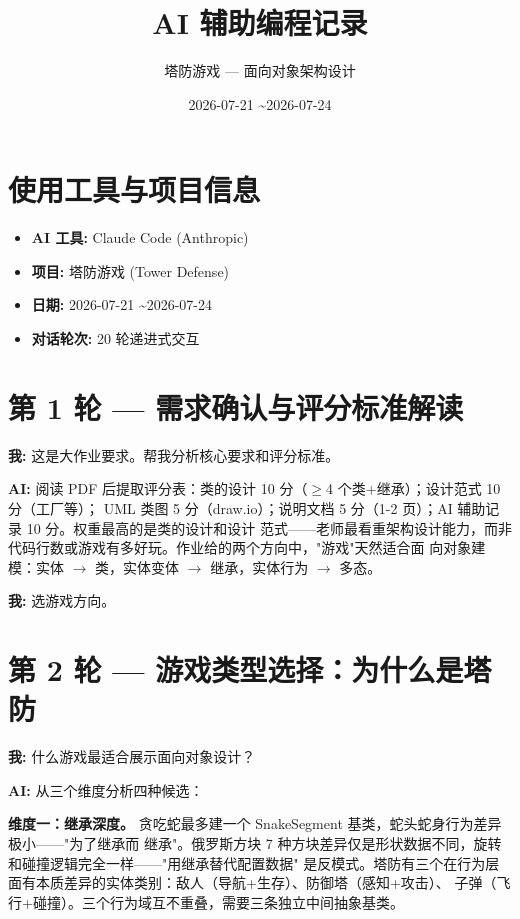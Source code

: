 \documentclass[12pt,a4paper]{ctexart}
\title{\textbf{AI 辅助编程记录}}
\author{塔防游戏 — 面向对象架构设计}
\date{2026-07-21 \textasciitilde 2026-07-24}
\begin{document}
\maketitle

\section*{使用工具与项目信息}

\begin{itemize}[noitemsep]
    \item \textbf{AI 工具:} Claude Code (Anthropic)
    \item \textbf{项目:} 塔防游戏 (Tower Defense)
    \item \textbf{日期:} 2026-07-21 \textasciitilde 2026-07-24
    \item \textbf{对话轮次:} 20 轮递进式交互
\end{itemize}

\section*{第 1 轮 — 需求确认与评分标准解读}

\textbf{我:} 这是大作业要求。帮我分析核心要求和评分标准。

\textbf{AI:} 阅读 PDF 后提取评分表：类的设计 10 分（$\geq$4 个类+继承）；设计范式 10 分（工厂等）；
UML 类图 5 分（draw.io）；说明文档 5 分（1-2 页）；AI 辅助记录 10 分。权重最高的是类的设计和设计
范式——老师最看重架构设计能力，而非代码行数或游戏有多好玩。作业给的两个方向中，"游戏"天然适合面
向对象建模：实体 $\rightarrow$ 类，实体变体 $\rightarrow$ 继承，实体行为 $\rightarrow$ 多态。

\textbf{我:} 选游戏方向。

\section*{第 2 轮 — 游戏类型选择：为什么是塔防}

\textbf{我:} 什么游戏最适合展示面向对象设计？

\textbf{AI:} 从三个维度分析四种候选：

\textbf{维度一：继承深度。} 贪吃蛇最多建一个 SnakeSegment 基类，蛇头蛇身行为差异极小——"为了继承而
继承"。俄罗斯方块 7 种方块差异仅是形状数据不同，旋转和碰撞逻辑完全一样——"用继承替代配置数据"
是反模式。塔防有三个在行为层面有本质差异的实体类别：敌人（导航+生存）、防御塔（感知+攻击）、
子弹（飞行+碰撞）。三个行为域互不重叠，需要三条独立中间抽象基类。
\end{document}
